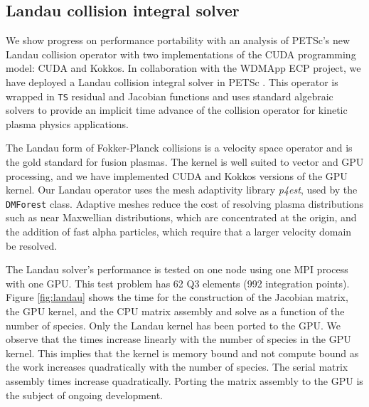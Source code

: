 \documentclass[5p,times]{elsarticle}
\begin{document}
\subsection{Landau collision integral solver}

We show progress on performance portability with an analysis of PETSc's new Landau collision operator with two implementations of the CUDA programming model: CUDA and Kokkos.
In collaboration with the WDMApp ECP project, we have deployed a Landau collision
integral solver in PETSc \cite{AdamsHirvijokiKnepleyBrownIsaacMills2017}. 
This operator is wrapped in {\tt TS} residual and Jacobian functions and uses standard algebraic solvers to provide an implicit time advance of the collision operator for kinetic plasma physics applications.

The Landau form of Fokker-Planck collisions is a velocity space
operator and is the gold standard for fusion plasmas. The kernel is well suited
to vector and GPU processing, and we have implemented CUDA and Kokkos versions of the GPU kernel.
Our Landau operator uses the mesh adaptivity library {\it p4est},
used by the {\tt DMForest} class. Adaptive meshes reduce the cost of
resolving plasma distributions such as near Maxwellian distributions, which are
concentrated at the origin, and the addition of fast alpha particles, which
require that a larger velocity domain be resolved.

The Landau solver's performance is tested  on one node using one MPI
process with one GPU. This test problem has 62 Q3 elements (992 integration
points). Figure \ref{fig:landau} shows the time for the construction of the
Jacobian matrix, the GPU kernel, and the CPU matrix assembly and solve as a
function of the number of species. Only the Landau
kernel has been ported to the GPU. We observe that the times increase linearly
with the number of species in the GPU kernel.
This implies that the kernel is memory bound and not compute bound as the work increases quadratically with the number of species.
The serial matrix assembly times increase quadratically. 
Porting the matrix assembly to the GPU is the subject of ongoing development.
\end{document}

